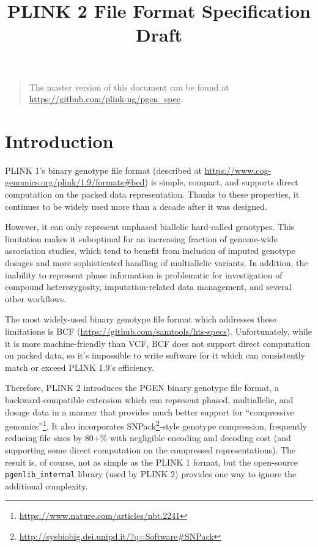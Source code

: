\documentclass[8pt]{article}
\begin{document}
\title{PLINK 2 File Format Specification Draft}
\maketitle
\begin{quote}\small
  The master version of this document can be found at
  \url{https://github.com/plink-ng/pgen_spec}. \\
\end{quote}

\newpage
\tableofcontents

\newpage
\section{Introduction}
PLINK 1's binary genotype file format (described at
\url{https://www.cog-genomics.org/plink/1.9/formats#bed}) is simple, compact,
and supports direct computation on the packed data representation.  Thanks to
these properties, it continues to be widely used more than a decade after it
was designed.

However, it can only represent unphased biallelic hard-called genotypes.  This
limitation makes it suboptimal for an increasing fraction of genome-wide
association studies, which tend to benefit from inclusion of imputed genotype
dosages and more sophisticated handling of multiallelic variants.  In addition,
the inability to represent phase information is problematic for investigation
of compound heterozygosity, imputation-related data management, and several
other workflows.

The most widely-used binary genotype file format which addresses these
limitations is BCF (\url{https://github.com/samtools/hts-specs}).
Unfortunately, while it is more machine-friendly than VCF, BCF does not support
direct computation on packed data, so it's impossible to write software for it
which can consistently match or exceed PLINK 1.9's efficiency.

Therefore, PLINK 2 introduces the PGEN binary genotype file format, a
backward-compatible extension which can represent phased, multiallelic, and
dosage data in a manner that provides much better support for ``compressive
genomics''\footnote{\url{https://www.nature.com/articles/nbt.2241}}.  It also
incorporates
SNPack\footnote{\url{http://sysbiobig.dei.unipd.it/?q=Software\#SNPack}}-style
genotype compression, frequently reducing file sizes by 80+\% with negligible
encoding and decoding cost (and supporting some direct computation on the
compressed representations).  The result is, of course, not as simple as the
PLINK 1 format, but the open-source \texttt{pgenlib\_internal} library (used by
PLINK 2) provides one way to ignore the additional complexity.
\end{document}
